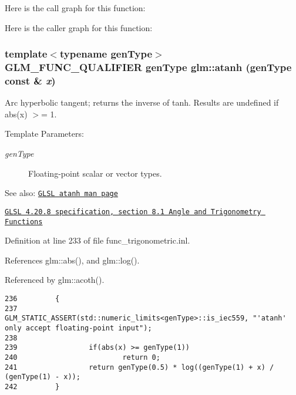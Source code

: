 Here is the call graph for this function:

Here is the caller graph for this function:\hypertarget{group__core__func__trigonometric_g5207916954ad98477bf488a9a188f045}{
\subsubsection[atanh]{\setlength{\rightskip}{0pt plus 5cm}template$<$typename genType$>$ GLM\_\-FUNC\_\-QUALIFIER genType glm::atanh (genType const \& {\em x})}}
\label{group__core__func__trigonometric_g5207916954ad98477bf488a9a188f045}


Arc hyperbolic tangent; returns the inverse of tanh. Results are undefined if abs(x) $>$= 1.

\begin{Desc}
\item[Template Parameters:]
\begin{description}
\item[{\em genType}]Floating-point scalar or vector types.\end{description}
\end{Desc}
\begin{Desc}
\item[See also:]\href{http://www.opengl.org/sdk/docs/manglsl/xhtml/atanh.xml}{\tt GLSL atanh man page} 

\href{http://www.opengl.org/registry/doc/GLSLangSpec.4.20.8.pdf}{\tt GLSL 4.20.8 specification, section 8.1 Angle and Trigonometry Functions} \end{Desc}


Definition at line 233 of file func\_\-trigonometric.inl.

References glm::abs(), and glm::log().

Referenced by glm::acoth().

\begin{Code}\begin{verbatim}236         {
237                 GLM_STATIC_ASSERT(std::numeric_limits<genType>::is_iec559, "'atanh' only accept floating-point input");
238                 
239                 if(abs(x) >= genType(1))
240                         return 0;
241                 return genType(0.5) * log((genType(1) + x) / (genType(1) - x));
242         }
\end{verbatim}
\end{Code}




